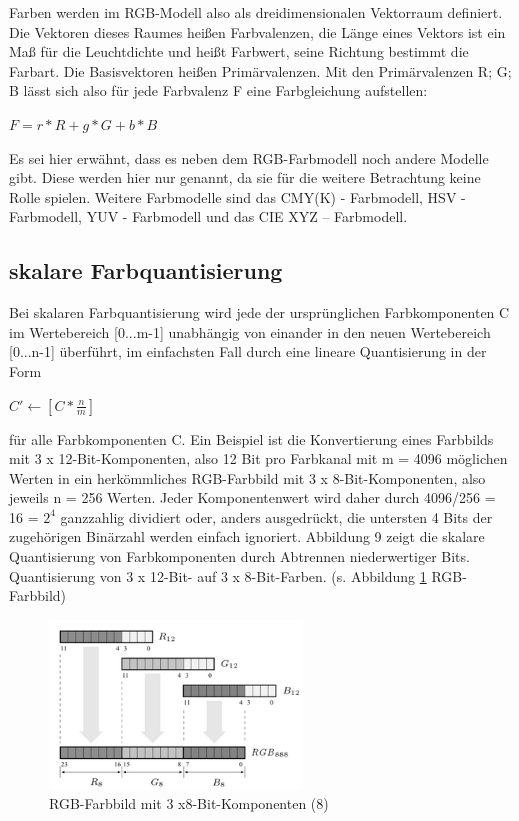 Farben werden im RGB-Modell also als dreidimensionalen Vektorraum definiert. Die Vektoren dieses Raumes heißen Farbvalenzen, die Länge eines Vektors ist ein Maß für die Leuchtdichte und heißt Farbwert, seine Richtung bestimmt die Farbart. Die Basisvektoren heißen Primärvalenzen. Mit den Primärvalenzen R; G; B lässt sich also für jede Farbvalenz F eine Farbgleichung aufstellen:

\begin{center}
$ F = r * R +g * G + b * B $
\end{center}


Es sei hier erwähnt, dass es neben dem RGB-Farbmodell noch andere Modelle gibt. Diese werden hier nur genannt, da sie für die weitere Betrachtung keine Rolle spielen. Weitere Farbmodelle sind das CMY(K) - Farbmodell, HSV - Farbmodell, YUV - Farbmodell und das CIE XYZ – Farbmodell.
\subsection{\textbf{skalare Farbquantisierung}}
Bei skalaren Farbquantisierung wird jede der ursprünglichen Farbkomponenten C im Wertebereich [0...m-1] unabhängig von einander in den neuen Wertebereich [0...n-1] überführt, im einfachsten Fall durch eine lineare Quantisierung in der Form
\begin{center}
$ C' \leftarrow [C * \frac{n}{m}] $
\end{center}

für alle Farbkomponenten C. Ein Beispiel ist die Konvertierung eines Farbbilds mit 3 x 12-Bit-Komponenten, also 12 Bit pro Farbkanal mit m = 4096 möglichen Werten in ein herkömmliches RGB-Farbbild mit 3 x 8-Bit-Komponenten, also jeweils n = 256 Werten. Jeder Komponentenwert wird daher durch 4096/256 = 16 = $ 2^4 $ ganzzahlig dividiert oder, anders ausgedrückt, die untersten 4 Bits der zugehörigen Binärzahl werden einfach ignoriert. Abbildung 9 zeigt die skalare Quantisierung von Farbkomponenten durch Abtrennen niederwertiger Bits. Quantisierung von 3 x 12-Bit- auf 3 x 8-Bit-Farben. (s. Abbildung \ref{fig:rgb_farbbild_steph} RGB-Farbbild)

\begin{figure}[h]
	\centering
		\includegraphics[width=0.6\textwidth]{img/rgb_farbbild_steph.png}
	\caption[RGB-Farbbild mit 3 x8-Bit-Komponenten (8)]{RGB-Farbbild mit 3 x8-Bit-Komponenten (8)}
\label{fig:rgb_farbbild_steph}
\end{figure}

